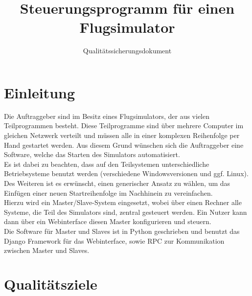 \documentclass[accentcolor=tud9c,12pt,paper=a4]{tudreport}
\title{Steuerungsprogramm für einen Flugsimulator}
\subtitle{Qualitätssicherungsdokument}
\begin{document}
	\maketitle
	\tableofcontents

	\chapter{Einleitung}
		Die Auftraggeber sind im Besitz eines Flugsimulators, der aus vielen 
		Teilprogrammen besteht. Diese Teilprogramme sind über mehrere Computer im
		gleichen Netzwerk verteilt und müssen alle in einer komplexen Reihenfolge per Hand 
		gestartet werden. Aus diesem Grund wünschen sich die Auftraggeber eine Software, welche
		das Starten des Simulators automatisiert.\\[5pt]
		Es ist dabei zu beachten, dass auf den Teilsystemen unterschiedliche 
		Betriebsysteme benutzt werden (verschiedene Windowsversionen und ggf. Linux). 
		Des Weiteren ist es erwünscht, einen generischer Ansatz zu wählen, um das Einfügen 
		einer neuen Startreihenfolge im Nachhinein zu vereinfachen.\\[5pt]
		Hierzu wird ein Master/Slave-System eingesetzt, wobei über einen Rechner alle 
		Systeme, die Teil des Simulators sind, zentral gesteuert werden. Ein Nutzer kann dann über
		ein Webinterface diesen Master konfigurieren und steuern.\\[5pt]
		Die Software für Master und Slaves ist in Python geschrieben und benutzt
		das Django Framework für das Webinterface, sowie RPC zur Kommunikation zwischen 
		Master und Slaves.
		

	\chapter{Qualitätsziele}
\end{document}
